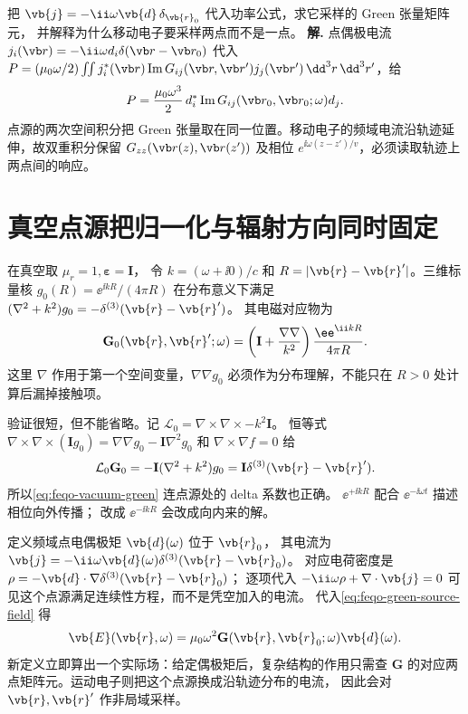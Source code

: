 \par
\begin{workedexample}
把 \(\vb{j}=-\ii\omega\vb{d}\,\delta_{\vb{r}_0}\)
代入功率公式，求它采样的 Green 张量矩阵元，
并解释为什么移动电子要采样两点而不是一点。
\textbf{解.} 点偶极电流 \(j_i(\vb r)=-\ii\omega d_i\delta(\vb r-\vb r_0)\) 代入 \(P=(\mu_0\omega/2)\iint j_i^*(\vb r)\operatorname{Im}G_{ij}(\vb r,\vb r')j_j(\vb r')\,\dd^3r\,\dd^3r'\)，给
\[
P=\frac{\mu_0\omega^3}{2}\,d_i^*\operatorname{Im}G_{ij}(\vb r_0,\vb r_0;\omega)d_j.
\]
点源的两次空间积分把 Green 张量取在同一位置。移动电子的频域电流沿轨迹延伸，故双重积分保留 \(G_{zz}(\vb r(z),\vb r(z'))\) 及相位 \(e^{\ii\omega(z-z')/v}\)，必须读取轨迹上两点间的响应。
\end{workedexample}
\par
\section{真空点源把归一化与辐射方向同时固定}
\label{sec:feqo-vacuum-dyadic}

在真空取 \(\mu_r=1,\boldsymbol\varepsilon=\mathbf I\)，
令 \(k=(\omega+\ii0)/c\) 和
\(R=|\vb{r}-\vb{r}'|\)。三维标量核
\(g_0(R)=\ee^{\ii kR}/(4\pi R)\) 在分布意义下满足
\((\nabla^2+k^2)g_0=-\delta^{(3)}(\vb{r}-\vb{r}')\)。
其电磁对应物为
\begin{equation}
\mathbf G_0(\vb{r},\vb{r}';\omega)
=\left(\mathbf I+\frac{\nabla\nabla}{k^2}\right)
\frac{\ee^{\ii kR}}{4\pi R}.
\label{eq:feqo-vacuum-green}
\end{equation}
这里 \(\nabla\) 作用于第一个空间变量，\(\nabla\nabla g_0\)
必须作为分布理解，不能只在 \(R>0\) 处计算后漏掉接触项。

验证很短，但不能省略。记
\(\mathcal L_0=\nabla\times\nabla\times-k^2\mathbf I\)。
恒等式
\(\nabla\times\nabla\times(\mathbf I g_0)
=\nabla\nabla g_0-\mathbf I\nabla^2g_0\)
和 \(\nabla\times\nabla f=0\) 给
\[
\mathcal L_0\mathbf G_0
=-\mathbf I(\nabla^2+k^2)g_0
=\mathbf I\delta^{(3)}(\vb{r}-\vb{r}').
\]
所以\cref{eq:feqo-vacuum-green} 连点源处的 delta 系数也正确。
\(\ee^{+\ii kR}\) 配合 \(\ee^{-\ii\omega t}\) 描述相位向外传播；
改成 \(\ee^{-\ii kR}\) 会改成向内来的解。

定义频域点电偶极矩 \(\vb{d}(\omega)\) 位于 \(\vb{r}_0\)，
其电流为
\(\vb{j}=-\ii\omega\vb{d}(\omega)
\delta^{(3)}(\vb{r}-\vb{r}_0)\)。
对应电荷密度是
\(\rho=-\vb{d}\cdot\nabla\delta^{(3)}(\vb{r}-\vb{r}_0)\)；
逐项代入 \(-\ii\omega\rho+\nabla\cdot\vb{j}=0\)
可见这个点源满足连续性方程，而不是凭空加入的电流。
代入\cref{eq:feqo-green-source-field} 得
\[
\vb{E}(\vb{r},\omega)
=\mu_0\omega^2
\mathbf G(\vb{r},\vb{r}_0;\omega)\vb{d}(\omega).
\]
新定义立即算出一个实际场：给定偶极矩后，复杂结构的作用只需查
\(\mathbf G\) 的对应两点矩阵元。运动电子则把这个点源换成沿轨迹分布的电流，
因此会对 \(\vb{r},\vb{r}'\) 作非局域采样。

